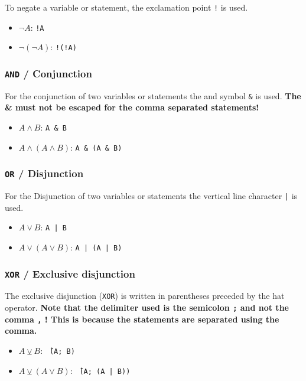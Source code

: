\documentclass[a4paper]{article}
\begin{document}
To negate a variable or statement, the exclamation point \texttt{!} is used.
\begin{itemize}
	\item $\lnot A$:  \texttt{!A}
	\item $\lnot (\lnot A)$: \texttt{!(!A)}
\end{itemize}

\subsubsection{\texttt{AND} / Conjunction}

For the conjunction of two variables or statements the and symbol \texttt{\&} is used. \textbf{The \& must not be escaped for the comma separated statements!}
\begin{itemize}
	\item $A \land B$:  \texttt{A \& B}
	\item $A \land (A \land B)$: \texttt{A \& (A \& B)}
\end{itemize}

\subsubsection{\texttt{OR} / Disjunction}

For the Disjunction of two variables or statements the vertical line character \texttt{|} is used.

\begin{itemize}
	\item $A \lor B$:  \texttt{A | B}
	\item $A \lor (A \lor B)$: \texttt{A | (A | B)}
\end{itemize}

\subsubsection{\texttt{XOR} /  Exclusive disjunction}

The exclusive disjunction (\texttt{XOR}) is written in parentheses preceded by the hat operator. \textbf{Note that the delimiter used is the semicolon \texttt{;} and not the comma \texttt{,} ! This is because the statements are separated using the comma.}

\begin{itemize}
	\item $A \veebar B$:  \texttt{\^\ (A; B)}
	\item $A \veebar (A \lor B)$: \texttt{\^\ (A; (A | B))}
\end{itemize}
\end{document}

